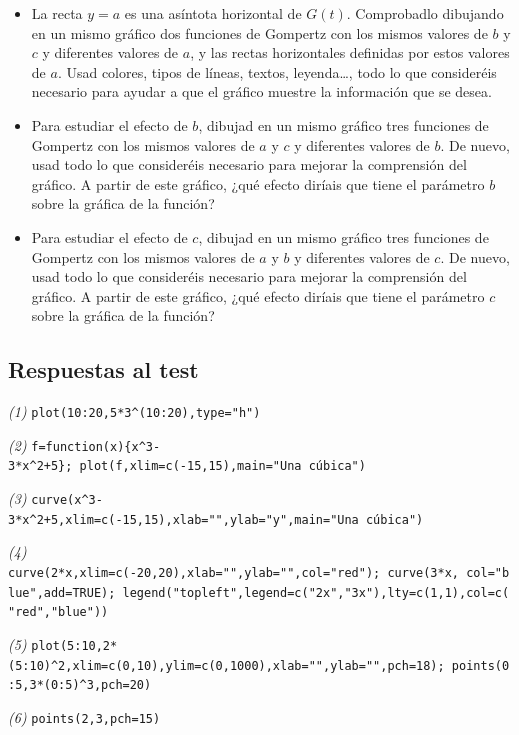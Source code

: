 \documentclass[]{book}
\providecommand{\tightlist}{%
  \setlength{\itemsep}{0pt}\setlength{\parskip}{0pt}}
\theoremstyle{definition}
\theoremstyle{definition}
\theoremstyle{definition}
\theoremstyle{remark}
\begin{document}
\begin{itemize}
\tightlist
\item
  La recta \(y=a\) es una asíntota horizontal de \(G(t)\). Comprobadlo dibujando en un mismo gráfico dos funciones de Gompertz con los mismos valores de \(b\) y \(c\) y diferentes valores de \(a\), y las rectas horizontales definidas por estos valores de \(a\). Usad colores, tipos de líneas, textos, leyenda\ldots, todo lo que consideréis necesario para ayudar a que el gráfico muestre la información que se desea.
\item
  Para estudiar el efecto de \(b\), dibujad en un mismo gráfico tres funciones de Gompertz con los mismos valores de \(a\) y \(c\) y diferentes valores de \(b\). De nuevo, usad todo lo que consideréis necesario para mejorar la comprensión del gráfico.
  A partir de este gráfico, ¿qué efecto diríais que tiene el parámetro \(b\) sobre la gráfica de la función?
\item
  Para estudiar el efecto de \(c\), dibujad en un mismo gráfico tres funciones de Gompertz con los mismos valores de \(a\) y \(b\) y diferentes valores de \(c\). De nuevo, usad todo lo que consideréis necesario para mejorar la comprensión del gráfico. A partir de este gráfico, ¿qué efecto diríais que tiene el parámetro \(c\) sobre la gráfica de la función?
\end{itemize}

\hypertarget{respuestas-al-test-4}{%
\subsection*{Respuestas al test}\label{respuestas-al-test-4}}

\emph{(1)} \texttt{plot(10:20,5*3\^{}(10:20),type="h")}

\emph{(2)} \texttt{f=function(x)\{x\^{}3-3*x\^{}2+5\};\ plot(f,xlim=c(-15,15),main="Una\ cúbica")}

\emph{(3)} \texttt{curve(x\^{}3-3*x\^{}2+5,xlim=c(-15,15),xlab="",ylab="y",main="Una\ cúbica")}

\emph{(4)} \texttt{curve(2*x,xlim=c(-20,20),xlab="",ylab="",col="red");\ curve(3*x,\ col="blue",add=TRUE);\ legend("topleft",legend=c("2x","3x"),lty=c(1,1),col=c("red","blue"))}

\emph{(5)} \texttt{plot(5:10,2*(5:10)\^{}2,xlim=c(0,10),ylim=c(0,1000),xlab="",ylab="",pch=18);\ points(0:5,3*(0:5)\^{}3,pch=20)}

\emph{(6)} \texttt{points(2,3,pch=15)}
\end{document}
